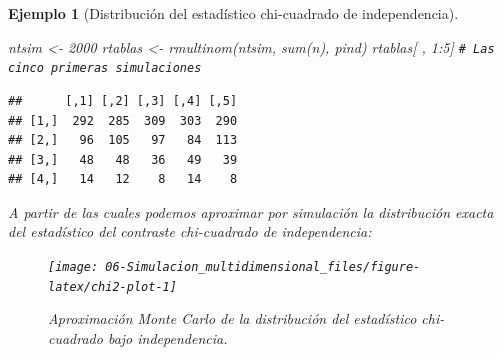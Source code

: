 \documentclass[
]{book}
\newenvironment{Shaded}{\begin{snugshade}}{\end{snugshade}}
\newcommand{\AttributeTok}[1]{\textcolor[rgb]{0.77,0.63,0.00}{#1}}
\newcommand{\CommentTok}[1]{\textcolor[rgb]{0.56,0.35,0.01}{\textit{#1}}}
\newcommand{\ConstantTok}[1]{\textcolor[rgb]{0.00,0.00,0.00}{#1}}
\newcommand{\ControlFlowTok}[1]{\textcolor[rgb]{0.13,0.29,0.53}{\textbf{#1}}}
\newcommand{\DecValTok}[1]{\textcolor[rgb]{0.00,0.00,0.81}{#1}}
\newcommand{\FunctionTok}[1]{\textcolor[rgb]{0.00,0.00,0.00}{#1}}
\newcommand{\NormalTok}[1]{#1}
\newcommand{\OtherTok}[1]{\textcolor[rgb]{0.56,0.35,0.01}{#1}}
\newcommand{\SpecialCharTok}[1]{\textcolor[rgb]{0.00,0.00,0.00}{#1}}
\newcommand{\StringTok}[1]{\textcolor[rgb]{0.31,0.60,0.02}{#1}}
\theoremstyle{break}
\newtheorem{example}{Ejemplo}[chapter]
\theoremstyle{nonumberplain}
\renewcommand{\CommentTok}[1]{\textcolor[rgb]{0.41,0.41,0.41}{\texttt{#1}}}
\begin{document}
\begin{example}[Distribución del estadístico chi-cuadrado de independencia]
\begin{Shaded}
\begin{Highlighting}[]
\NormalTok{ntsim }\OtherTok{\textless{}{-}} \DecValTok{2000}
\NormalTok{rtablas }\OtherTok{\textless{}{-}} \FunctionTok{rmultinom}\NormalTok{(ntsim, }\FunctionTok{sum}\NormalTok{(n), pind)}
\NormalTok{rtablas[ , }\DecValTok{1}\SpecialCharTok{:}\DecValTok{5}\NormalTok{] }\CommentTok{\# Las cinco primeras simulaciones}
\end{Highlighting}
\end{Shaded}

\begin{verbatim}
##      [,1] [,2] [,3] [,4] [,5]
## [1,]  292  285  309  303  290
## [2,]   96  105   97   84  113
## [3,]   48   48   36   49   39
## [4,]   14   12    8   14    8
\end{verbatim}

A partir de las cuales podemos aproximar por simulación la distribución exacta del estadístico del contraste chi-cuadrado de independencia:

\begin{Shaded}
\end{Shaded}

\begin{figure}[!htb]

{\centering \texttt{[image: 06-Simulacion\_multidimensional\_files/figure-latex/chi2-plot-1]} 

}

\caption{Aproximación Monte Carlo de la distribución del estadístico chi-cuadrado bajo independencia.}\label{fig:chi2-plot}
\end{figure}


\end{example}
\end{document}
